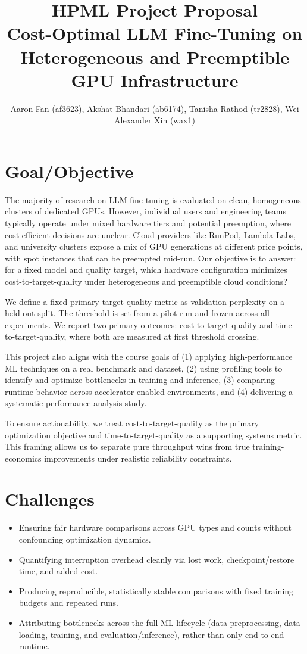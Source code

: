 \documentclass[10pt]{article}
\title{HPML Project Proposal \\ Cost-Optimal LLM Fine-Tuning on Heterogeneous and Preemptible GPU Infrastructure}
\author{Aaron Fan (af3623), Akshat Bhandari (ab6174), Tanisha Rathod (tr2828), Wei Alexander Xin (wax1)}
\begin{document}
\maketitle
\vspace{-8pt}

\section{Goal/Objective}
The majority of research on LLM fine-tuning is evaluated on clean, homogeneous clusters of dedicated GPUs. However, individual users and engineering teams typically operate under mixed hardware tiers and potential preemption, where cost-efficient decisions are unclear. Cloud providers like RunPod, Lambda Labs, and university clusters expose a mix of GPU generations at different price points, with spot instances that can be preempted mid-run. Our objective is to answer: for a fixed model and quality target, which hardware configuration minimizes cost-to-target-quality under heterogeneous and preemptible cloud conditions?

We define a fixed primary target-quality metric as validation perplexity on a held-out split. The threshold is set from a pilot run and frozen across all experiments. We report two primary outcomes: cost-to-target-quality and time-to-target-quality, where both are measured at first threshold crossing.

This project also aligns with the course goals of (1) applying high-performance ML techniques on a real benchmark and dataset, (2) using profiling tools to identify and optimize bottlenecks in training and inference, (3) comparing runtime behavior across accelerator-enabled environments, and (4) delivering a systematic performance analysis study.

To ensure actionability, we treat cost-to-target-quality as the primary optimization objective and time-to-target-quality as a supporting systems metric. This framing allows us to separate pure throughput wins from true training-economics improvements under realistic reliability constraints.

\section{Challenges}
\begin{itemize}
  \item Ensuring fair hardware comparisons across GPU types and counts without confounding optimization dynamics.
  \item Quantifying interruption overhead cleanly via lost work, checkpoint/restore time, and added cost.
  \item Producing reproducible, statistically stable comparisons with fixed training budgets and repeated runs.
  \item Attributing bottlenecks across the full ML lifecycle (data preprocessing, data loading, training, and evaluation/inference), rather than only end-to-end runtime.
\end{itemize}
\end{document}
